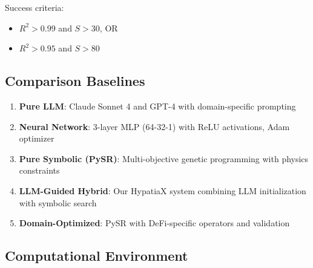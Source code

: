 Success criteria:
\begin{itemize}
    \item $R^2 > 0.99$ and $S > 30$, OR
    \item $R^2 > 0.95$ and $S > 80$
\end{itemize}


\subsection{Comparison Baselines}

\begin{enumerate}
\item \textbf{Pure LLM}: Claude Sonnet 4 and GPT-4 with domain-specific prompting
\item \textbf{Neural Network}: 3-layer MLP (64-32-1) with ReLU activations, Adam optimizer
\item \textbf{Pure Symbolic (PySR)}: Multi-objective genetic programming with physics constraints
\item \textbf{LLM-Guided Hybrid}: Our HypatiaX system combining LLM initialization with symbolic search
\item \textbf{Domain-Optimized}: PySR with DeFi-specific operators and validation
\end{enumerate}

\subsection{Computational Environment}

